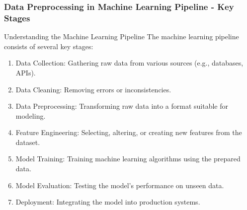 \documentclass[aspectratio=169]{beamer}
\begin{document}
\begin{frame}[fragile]
    \frametitle{Data Preprocessing in Machine Learning Pipeline - Key Stages}
    
    \begin{block}{Understanding the Machine Learning Pipeline}
        The machine learning pipeline consists of several key stages:
    \end{block}
    
    \begin{enumerate}
        \item Data Collection: Gathering raw data from various sources (e.g., databases, APIs).
        \item Data Cleaning: Removing errors or inconsistencies.
        \item Data Preprocessing: Transforming raw data into a format suitable for modeling.
        \item Feature Engineering: Selecting, altering, or creating new features from the dataset.
        \item Model Training: Training machine learning algorithms using the prepared data.
        \item Model Evaluation: Testing the model's performance on unseen data.
        \item Deployment: Integrating the model into production systems.
    \end{enumerate}
\end{frame}
\end{document}
